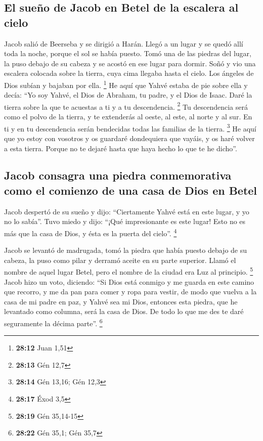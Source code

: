 \begin{paracol}{2}
\hypertarget{el-sueuxf1o-de-jacob-en-betel-de-la-escalera-al-cielo}{%
\subsection{El sueño de Jacob en Betel de la escalera al
cielo}\label{el-sueuxf1o-de-jacob-en-betel-de-la-escalera-al-cielo}}

 Jacob salió de Beerseba y se dirigió a Harán.
 Llegó a un lugar y se quedó allí toda la noche, porque
el sol se había puesto. Tomó una de las piedras del lugar, la puso
debajo de su cabeza y se acostó en ese lugar para dormir.
 Soñó y vio una escalera colocada sobre la tierra, cuya
cima llegaba hasta el cielo. Los ángeles de Dios subían y bajaban por
ella. \footnote{\textbf{28:12} Juan 1,51}  He aquí que
Yahvé estaba de pie sobre ella y decía: ``Yo soy Yahvé, el Dios de
Abraham, tu padre, y el Dios de Isaac. Daré la tierra sobre la que te
acuestas a ti y a tu descendencia. \footnote{\textbf{28:13} Gén 12,7}
 Tu descendencia será como el polvo de la tierra, y te
extenderás al oeste, al este, al norte y al sur. En ti y en tu
descendencia serán bendecidas todas las familias de la tierra.
\footnote{\textbf{28:14} Gén 13,16; Gén 12,3}  He aquí
que yo estoy con vosotros y os guardaré dondequiera que vayáis, y os
haré volver a esta tierra. Porque no te dejaré hasta que haya hecho lo
que te he dicho''.

\hypertarget{jacob-consagra-una-piedra-conmemorativa-como-el-comienzo-de-una-casa-de-dios-en-betel}{%
\subsection{Jacob consagra una piedra conmemorativa como el comienzo de
una casa de Dios en
Betel}\label{jacob-consagra-una-piedra-conmemorativa-como-el-comienzo-de-una-casa-de-dios-en-betel}}

 Jacob despertó de su sueño y dijo: ``Ciertamente Yahvé
está en este lugar, y yo no lo sabía''.  Tuvo miedo y
dijo: ``¡Qué impresionante es este lugar! Esto no es más que la casa de
Dios, y ésta es la puerta del cielo''. \footnote{\textbf{28:17} Éxod 3,5}

 Jacob se levantó de madrugada, tomó la piedra que había
puesto debajo de su cabeza, la puso como pilar y derramó aceite en su
parte superior.  Llamó el nombre de aquel lugar Betel,
pero el nombre de la ciudad era Luz al principio. \footnote{\textbf{28:19}
  Gén 35,14-15}  Jacob hizo un voto, diciendo: ``Si Dios
está conmigo y me guarda en este camino que recorro, y me da pan para
comer y ropa para vestir,  de modo que vuelva a la casa
de mi padre en paz, y Yahvé sea mi Dios,  entonces esta
piedra, que he levantado como columna, será la casa de Dios. De todo lo
que me des te daré seguramente la décima parte''. \footnote{\textbf{28:22}
  Gén 35,1; Gén 35,7}


\end{paracol}
